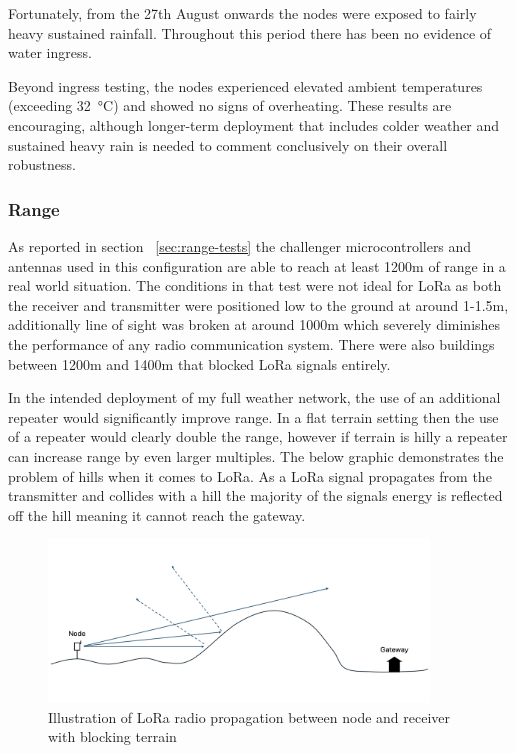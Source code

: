 Fortunately, from the 27th August onwards the nodes were exposed to fairly heavy
sustained rainfall. Throughout this period there has been no evidence of water
ingress.

Beyond ingress testing, the nodes experienced elevated ambient temperatures
(exceeding \SI{32}{\degreeCelsius}) and showed no signs of overheating. These
results are encouraging, although longer-term deployment that includes colder
weather and sustained heavy rain is needed to comment conclusively on their
overall robustness.

\subsubsection{Range}\label{sec:range-eval}

As reported in section ~\ref{sec:range-tests} the challenger microcontrollers
and antennas used in this configuration are able to reach at least 1200m of
range in a real world situation. The conditions in that test were not ideal for
LoRa as both the receiver and transmitter were positioned low to the ground at
around 1-1.5m, additionally line of sight was broken at around 1000m which
severely diminishes the performance of any radio communication system. There
were also buildings between 1200m and 1400m that blocked LoRa signals entirely.

In the intended deployment of my full weather network, the use of an additional
repeater would significantly improve range. In a flat terrain setting then the
use of a repeater would clearly double the range, however if terrain is hilly a
repeater can increase range by even larger multiples. The below graphic
demonstrates the problem of hills when it comes to LoRa. As a LoRa signal
propagates from the transmitter and collides with a hill the majority of the
signals energy is reflected off the hill meaning it cannot reach the gateway.

\begin{figure}[H]
    \centering
    \includegraphics[width=0.9\textwidth]{contents/part-4/fig4/no-repeater.png}
    \caption{Illustration of LoRa radio propagation between node and receiver with blocking terrain}
    \label{fig:no-repeater}
\end{figure}

